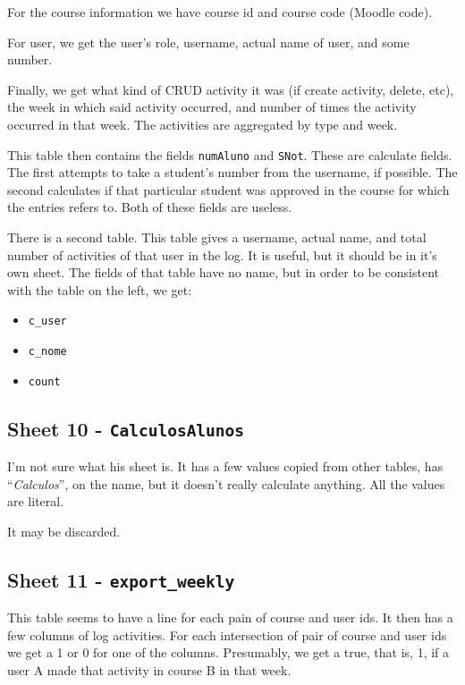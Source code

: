 For the course information we have course id and course code (Moodle code).

For user, we get the user's role, username, actual name of user, and some
number.

Finally, we get what kind of CRUD activity it was (if create activity, delete,
etc), the week in which said activity occurred, and number of times the
activity occurred in that week. The activities are aggregated by type and week.

This table then contains the fields \texttt{numAluno} and \texttt{SNot}. These
are calculate fields. The first attempts to take a student's number from the
username, if possible. The second calculates if that particular student was
approved in the course for which the entries refers to. Both of these fields
are useless.

There is a second table. This table gives a username, actual name, and total
number of activities of that user in the log. It is useful, but it should be in
it's own sheet. The fields of that table have no name, but in order to be
consistent with the table on the left, we get:

\begin{itemize}
    \item \texttt{c\_user}
    \item \texttt{c\_nome}
    \item \texttt{count}
\end{itemize}

\subsection{Sheet 10 - \texttt{CalculosAlunos}}

I'm not sure what his sheet is. It has a few values copied from other tables,
has ``\textit{Calculos}'', on the name, but it doesn't really calculate
anything. All the values are literal.

It may be discarded.

\subsection{Sheet 11 - \texttt{export\_weekly}}

This table seems to have a line for each pain of course and user ids. It then
has a few columns of log activities. For each intersection of pair of course
and user ids we get a 1 or 0 for one of the columns. Presumably, we get a true,
that is, 1, if a user A made that activity in course B in that week.

